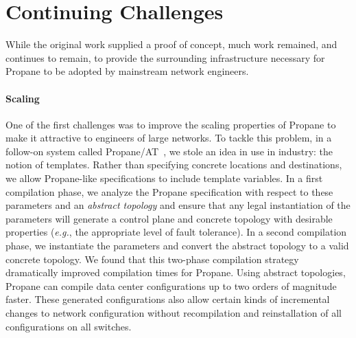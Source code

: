 \documentclass[sigconf]{acmart}
\begin{document}


\section{Continuing Challenges}

While the original work supplied a proof of concept, much work
remained, and continues to remain, to provide the surrounding
infrastructure necessary for Propane to be adopted by mainstream network engineers.

\paragraph*{Scaling} One of the first challenges was to improve the scaling
properties of Propane to make it attractive to engineers of large
networks.  To tackle this problem, in a follow-on system called Propane/AT~\cite{abstract-propane}, we stole an idea in use in
industry: the notion of templates.  Rather than specifying concrete
locations and destinations, we allow Propane-like specifications to include
template variables.  In a first compilation phase, we analyze the
Propane specification with respect to these parameters and an
\emph{abstract topology} and ensure that any legal instantiation of
the parameters will generate a control plane and concrete topology
with desirable properties (\emph{e.g.}, the appropriate level of fault
tolerance).  In a second compilation phase, we instantiate the
parameters and convert the abstract topology to a valid concrete
topology.  We found that this two-phase compilation strategy
dramatically improved compilation times for Propane.  Using abstract
topologies, Propane can compile data center configurations up to two
orders of magnitude faster.  These generated configurations also
allow certain kinds of incremental changes to network configuration
without recompilation and reinstallation of all configurations on all
switches.  
\end{document}
